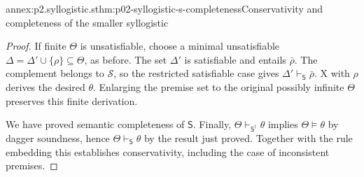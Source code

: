\begin{annexitem}{annex:p2.syllogistic.s}{thm:p02-syllogistic-s-completeness}{Conservativity and completeness of the smaller syllogistic}
\begin{proof}
If finite \(\Theta\) is unsatisfiable, choose a minimal unsatisfiable
\(\Delta=\Delta'\cup\{\rho\}\subseteq\Theta\), as before.
The set \(\Delta'\) is satisfiable and entails \(\bar\rho\).
The complement belongs to \(\mathcal S\), so the restricted satisfiable
case gives \(\Delta'\vdash_{\mathsf S}\bar\rho\). X with \(\rho\)
derives the desired \(\theta\). Enlarging the premise set to the original
possibly infinite \(\Theta\) preserves this finite derivation.

We have proved semantic completeness of \(\mathsf S\). Finally,
\(\Theta\vdash_{\mathsf S^\dagger}\theta\) implies
\(\Theta\models\theta\) by dagger soundness, hence
\(\Theta\vdash_{\mathsf S}\theta\) by the result just proved.
Together with the rule embedding this establishes conservativity, including
the case of inconsistent premises.
\end{proof}
\end{annexitem}

